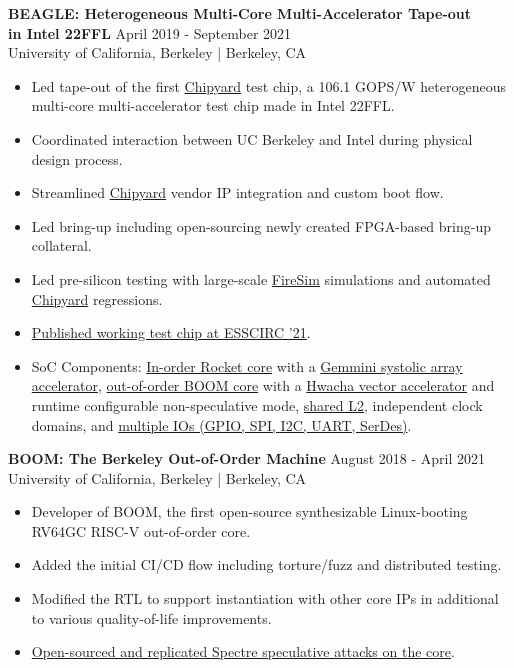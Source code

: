 \documentclass[line]{res}
\begin{document}
\begin{resume}
\label{sec:beagle}
\textbf{BEAGLE: Heterogeneous Multi-Core Multi-Accelerator Tape-out\\in Intel 22FFL} \hfill April 2019 - September 2021
\\
University of California, Berkeley | Berkeley, CA
\\
\vspace{-3mm}
\begin{itemize}
\item Led tape-out of the first \hyperref[sec:chipyard]{Chipyard} test chip, a 106.1 GOPS/W heterogeneous multi-core multi-accelerator test chip made in Intel 22FFL.
\item Coordinated interaction between UC Berkeley and Intel during physical design process.
\item Streamlined \hyperref[sec:chipyard]{Chipyard} vendor IP integration and custom boot flow.
\item Led bring-up including open-sourcing newly created FPGA-based bring-up collateral.
\item Led pre-silicon testing with large-scale \hyperref[sec:firesim]{FireSim} simulations and automated \hyperref[sec:chipyard]{Chipyard} regressions.
\item \hyperref[sec:beaglepaper]{Published working test chip at ESSCIRC '21}.
\item SoC Components: \href{https://www2.eecs.berkeley.edu/Pubs/TechRpts/2016/EECS-2016-17.pdf}{In-order Rocket core} with a \href{https://dl.acm.org/doi/10.1109/DAC18074.2021.9586216}{Gemmini systolic array accelerator}, \hyperref[sec:boom]{out-of-order BOOM core} with a \href{https://people.eecs.berkeley.edu/~krste/papers/EECS-2015-263.pdf}{Hwacha vector accelerator} and runtime configurable non-speculative mode, \href{https://github.com/chipsalliance/rocket-chip-inclusive-cache}{shared L2}, independent clock domains, and \href{https://github.com/chipsalliance/rocket-chip-blocks}{multiple IOs (GPIO, SPI, I2C, UART, SerDes)}.
\end{itemize}

\vspace{-2mm}

\label{sec:boom}
\textbf{BOOM: The Berkeley Out-of-Order Machine} \hfill August 2018 - April 2021
\\
University of California, Berkeley | Berkeley, CA
\\
\vspace{-3mm}
\begin{itemize}
\item Developer of BOOM, the first open-source synthesizable Linux-booting RV64GC RISC-V out-of-order core.
\item Added the initial CI/CD flow including torture/fuzz and distributed testing.
\item Modified the RTL to support instantiation with other core IPs in additional to various quality-of-life improvements.
\item \hyperref[sec:spectrerepl]{Open-sourced and replicated Spectre speculative attacks on the core}.
\end{itemize}


\end{resume}
\end{document}
